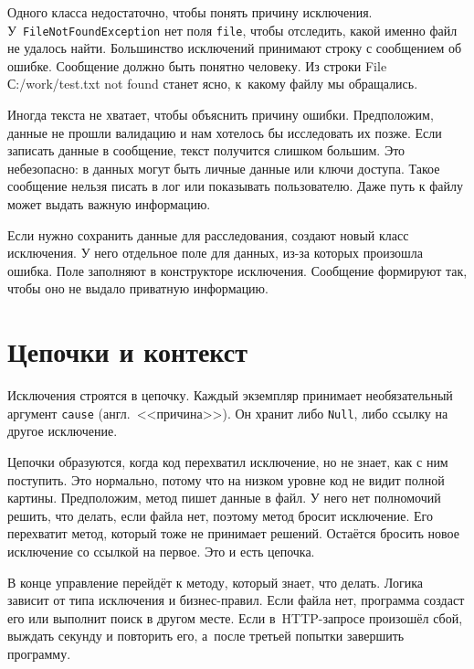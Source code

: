 Одного класса недостаточно, чтобы понять причину
исключения. У~\verb|FileNotFoundException| нет поля \verb|file|, чтобы
отследить, какой именно файл не удалось найти. Большинство исключений принимают
строку с сообщением об ошибке. Сообщение должно быть понятно человеку. Из строки
File С:/work/test.txt not found станет ясно, к~какому файлу мы обращались.


Иногда текста не хватает, чтобы объяснить причину ошибки. Предположим, данные не
прошли валидацию и нам хотелось бы исследовать их позже. Если записать данные в
сообщение, текст получится слишком большим. Это небезопасно: в данных могут быть
личные данные или ключи доступа. Такое сообщение нельзя писать в лог или
показывать пользователю. Даже путь к файлу может выдать важную информацию.

Если нужно сохранить данные для расследования, создают новый класс исключения. У
него отдельное поле для данных, из-за которых произошла ошибка. Поле заполняют в
конструкторе исключения. Сообщение формируют так, чтобы оно не выдало приватную
информацию.

\section{Цепочки и контекст}


Исключения строятся в цепочку. Каждый экземпляр принимает необязательный
аргумент \verb|cause| (англ.~<<причина>>). Он хранит либо \verb|Null|, либо
ссылку на другое исключение.



Цепочки образуются, когда код перехватил исключение, но не знает, как с ним
поступить.  Это нормально, потому что на низком уровне код не видит полной
картины. Предположим, метод пишет данные в файл. У него нет полномочий решить,
что делать, если файла нет, поэтому метод бросит исключение. Его перехватит
метод, который тоже не принимает решений. Остаётся бросить новое исключение
со ссылкой на первое. Это и есть цепочка.

В конце управление перейдёт к методу, который знает, что делать. Логика зависит
от типа исключения и бизнес-правил. Если файла нет, программа создаст его или
выполнит поиск в другом месте. Если в~HTTP-запросе произошёл сбой, выждать
секунду и повторить его, а~после третьей попытки завершить программу.

